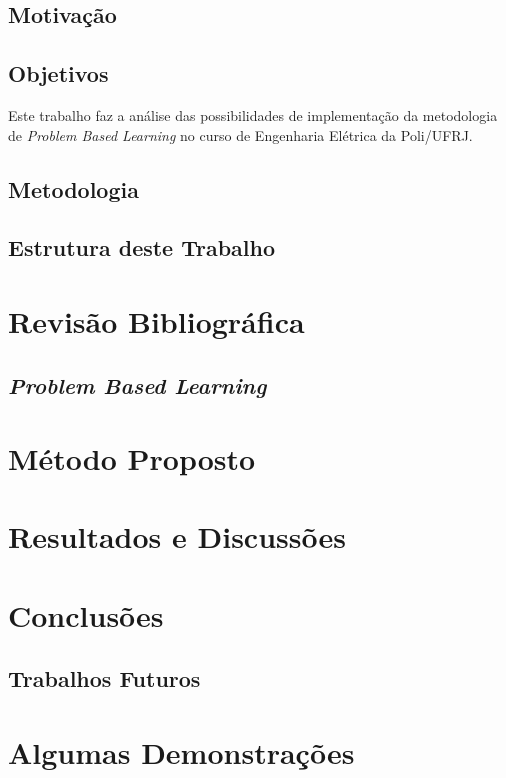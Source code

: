 \documentclass[grad,numbers]{coppe}
\begin{document}
	\section{Motivação}
		
	\section{Objetivos}
	
		Este trabalho faz a análise das possibilidades de implementação da metodologia de \textit{Problem Based Learning} no curso de Engenharia Elétrica da Poli/UFRJ.
		
	\section{Metodologia}
		
	\section{Estrutura deste Trabalho}

\chapter{Revisão Bibliográfica}

	\section{\textit{Problem Based Learning}}

  
\chapter{Método Proposto}
  
  
\chapter{Resultados e Discussões}
  
  
\chapter{Conclusões}

	\section{Trabalhos Futuros}
  

\backmatter



\appendix
\chapter{Algumas Demonstrações}
  	
\end{document}
